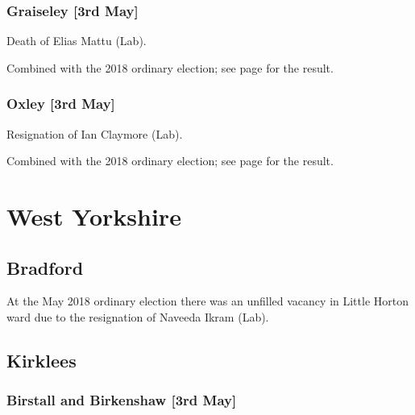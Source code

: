 \documentclass[a4paper,openany]{book}
\begin{document}
\begin{resultsiii}
\subsubsection*{Graiseley \hspace*{\fill}\nolinebreak[1]%
\enspace\hspace*{\fill}
[3rd May]}


Death of Elias Mattu (Lab).

Combined with the 2018 ordinary election; see page \pageref{GraiseleyWolverhampton} for the result.

\subsubsection*{Oxley \hspace*{\fill}\nolinebreak[1]%
\enspace\hspace*{\fill}
[3rd May]}


Resignation of Ian Claymore (Lab).

Combined with the 2018 ordinary election; see page \pageref{OxleyWolverhampton} for the result.

\section{West Yorkshire}

\subsection*{Bradford}

At the May 2018 ordinary election there was an unfilled vacancy in Little Horton ward due to the resignation of Naveeda Ikram (Lab).

\subsection*{Kirklees}

\subsubsection*{Birstall and Birkenshaw \hspace*{\fill}\nolinebreak[1]%
\enspace\hspace*{\fill}
[3rd May]}


\end{resultsiii}
\end{document}
